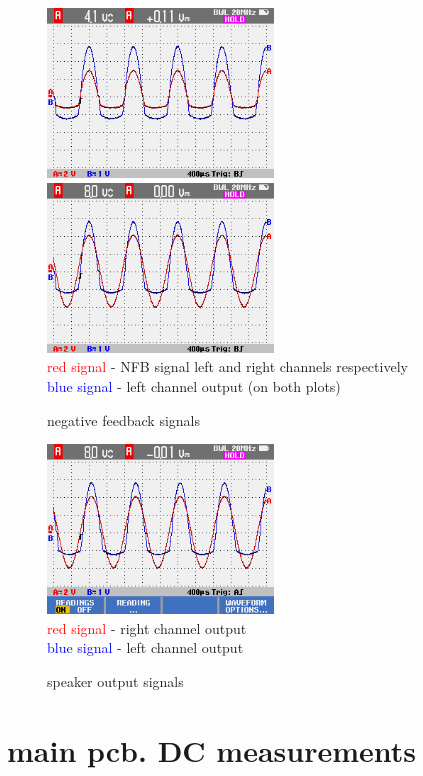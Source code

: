 \documentclass[a4paper,twoside,notitlepage]{article}
\begin{document}
\begin{figure}[hptb!]
    \centering
    \includegraphics[width=6cm]{img_report/left_NFB.png}
    \includegraphics[width=6cm]{img_report/right_NFB.png} \\ 
    \textcolor{Red}{red signal} - NFB signal left and right channels respectively \\
    \textcolor{Blue}{blue signal} - left channel output (on both plots) \\
 \caption{negative feedback signals}
 \label{fig:NFB}
\end{figure}

\begin{figure}[hptb!]
    \centering
    \includegraphics[width=6cm]{img_report/outputs_broken.png} \\
    \textcolor{Red}{red signal} - right channel output \\
    \textcolor{Blue}{blue signal} - left channel output \\
 \caption{speaker output signals}
 \label{fig:output}
\end{figure}

\clearpage
\section{main pcb. DC measurements} \label{sec:dc-measurements}
\end{document}
